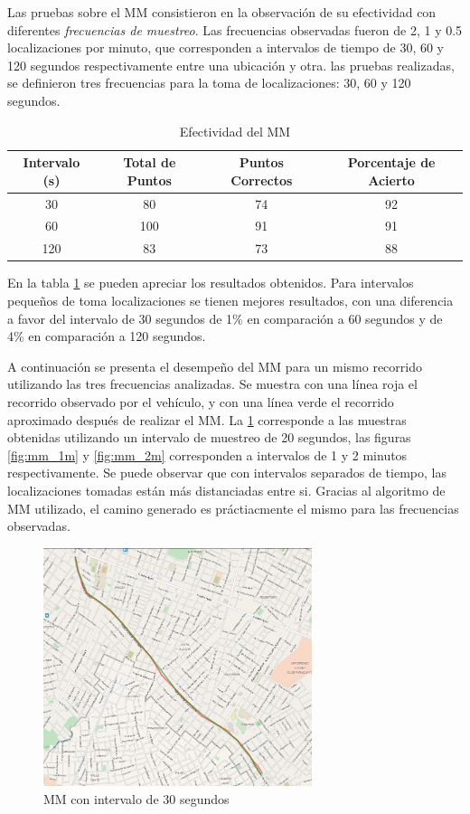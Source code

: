 Las pruebas sobre el MM consistieron en la observación de su efectividad con diferentes \emph{frecuencias de muestreo}. Las frecuencias observadas fueron de 2, 1 y 0.5 localizaciones por minuto, que corresponden a intervalos de tiempo de 30, 60 y 120 segundos respectivamente entre una ubicación y otra. las pruebas realizadas, se definieron  tres frecuencias para la toma de localizaciones: 30, 60 y 120 segundos. 

\begin{table}[ht]
	\caption{Efectividad del MM} 
	\centering
	\begin{tabular}{c c c c}
		\hline\hline
		Intervalo (s) & Total de Puntos & Puntos Correctos & Porcentaje de Acierto\\ [0.5ex]
		\hline
		30 & 80 & 74 & 92 \\
		60 & 100 & 91 & 91 \\
		120 & 83 & 73 & 88\\ [1ex]
		\hline
	\end{tabular}
	\label{table:map_matching}
\end{table}

En la tabla \ref{table:map_matching} se pueden apreciar los resultados obtenidos. Para intervalos pequeños de toma localizaciones  se tienen mejores resultados, con una diferencia a favor del intervalo de 30 segundos de 1\% en comparación a 60 segundos y de 4\% en comparación a 120 segundos.  

A continuación se presenta el desempeño del MM para un mismo recorrido utilizando las tres frecuencias analizadas. Se muestra con una línea roja el recorrido observado por el vehículo, y con una línea verde el recorrido aproximado después de realizar el MM. La \cref{fig:mm_30s} corresponde a las muestras obtenidas utilizando un intervalo de muestreo de 20 segundos, las figuras \ref{fig:mm_1m} y \ref{fig:mm_2m} corresponden a intervalos de 1 y 2 minutos respectivamente. Se puede observar que con intervalos separados de tiempo, las localizaciones tomadas están más distanciadas entre si. Gracias al algoritmo de MM utilizado, el camino generado es práctiacmente el mismo para las frecuencias observadas.

\begin{figure}[!htb]
	\centering
	\includegraphics[width=0.7\textwidth]{capitulos/7/figuras/figura1.jpg}
	\caption{\label{fig:mm_30s} MM con intervalo de 30 segundos}	
\end{figure}


